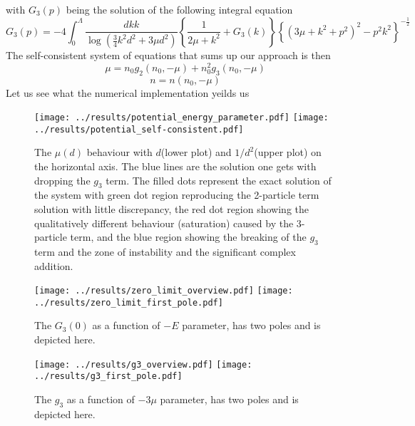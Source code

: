 \documentclass[8pt,letterpaper,notitlepage]{article}
\begin{document}
with $G_3(p)$ being the solution of the following integral equation 
\[
G_3(p) = - 4 \int^{\Lambda}_0 \frac{dk k}{\log \left( \frac{3}{4} k^2 d^2  + 3 \mu d^2 \right)}
\left\{ \frac{1}{2 \mu + k^2} + G_3(k) \right\}
\left\{ 
(3 \mu + k^2 + p^2)^2 -  p^2 k^2
\right\}^{-\frac{1}{2}}
\]
The self-consistent system of equations that sums up our approach is then
\[
\mu = n_0 g_2 (n_0, - \mu) + n_0^2 g_3 (n_0, - \mu)
\]
\[
n = n (n_0, - \mu)
\]
Let us see what the numerical implementation yeilds us
\begin{figure}[h]
\begin{center}
\texttt{[image: ../results/potential\_energy\_parameter.pdf]}
\texttt{[image: ../results/potential\_self-consistent.pdf]}
\caption{The $\mu(d)$ behaviour with $d$(lower plot) and $1/d^2$(upper plot) on the horizontal axis. The blue lines are the solution one gets with dropping the $g_3$ term. The filled dots represent the exact solution of the system with green dot region reproducing the 2-particle term solution with little discrepancy, the red dot region showing the qualitatively different behaviour (saturation) caused by the 3-particle term, and the blue region showing the breaking of the $g_3$ term and the zone of instability and the significant complex addition.}
\label{diagram}
\end{center}
\end{figure}

\begin{figure}[h]
\begin{center}
\texttt{[image: ../results/zero\_limit\_overview.pdf]}
\texttt{[image: ../results/zero\_limit\_first\_pole.pdf]}
\caption{The $G_3(0)$ as a function of $-E$ parameter, has two poles and is depicted here.}
\label{diagram}
\end{center}
\end{figure}

\begin{figure}[h]
\begin{center}
\texttt{[image: ../results/g3\_overview.pdf]}
\texttt{[image: ../results/g3\_first\_pole.pdf]}
\caption{The $g_3$ as a function of $-3 \mu$ parameter, has two poles and is depicted here.}
\label{diagram}
\end{center}
\end{figure}
\end{document}
